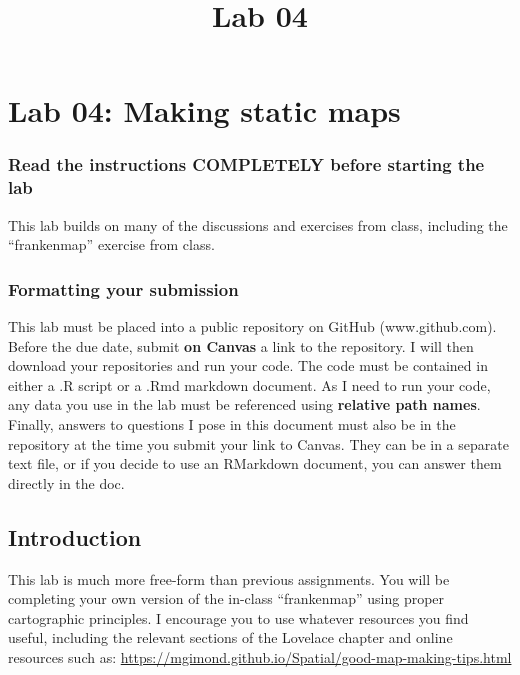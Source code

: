 \documentclass[]{article}
\title{Lab 04}
\author{}
\date{}
\makeatletter
\renewcommand{\maketitle}{\bgroup\vspace*{-1cm}\setlength{\parindent}{0pt}
\begin{flushleft}
  \@author
  
  \@date
  
\end{flushleft}\egroup
}
\makeatother
\begin{document}
\maketitle

\hypertarget{lab-04-making-static-maps}{%
\section{Lab 04: Making static maps}\label{lab-04-making-static-maps}}

\hypertarget{read-the-instructions-completely-before-starting-the-lab}{%
\subsubsection{Read the instructions COMPLETELY before starting the
lab}\label{read-the-instructions-completely-before-starting-the-lab}}

This lab builds on many of the discussions and exercises from class,
including the ``frankenmap'' exercise from class.

\hypertarget{formatting-your-submission}{%
\subsubsection{Formatting your
submission}\label{formatting-your-submission}}

This lab must be placed into a public repository on GitHub
(www.github.com). Before the due date, submit \textbf{on Canvas} a link
to the repository. I will then download your repositories and run your
code. The code must be contained in either a .R script or a .Rmd
markdown document. As I need to run your code, any data you use in the
lab must be referenced using \textbf{relative path names}. Finally,
answers to questions I pose in this document must also be in the
repository at the time you submit your link to Canvas. They can be in a
separate text file, or if you decide to use an RMarkdown document, you
can answer them directly in the doc.

\hypertarget{introduction}{%
\subsection{Introduction}\label{introduction}}

This lab is much more free-form than previous assignments. You will be
completing your own version of the in-class ``frankenmap'' using proper
cartographic principles. I encourage you to use whatever resources you
find useful, including the relevant sections of the Lovelace chapter and
online resources such as:
\url{https://mgimond.github.io/Spatial/good-map-making-tips.html}
\end{document}
